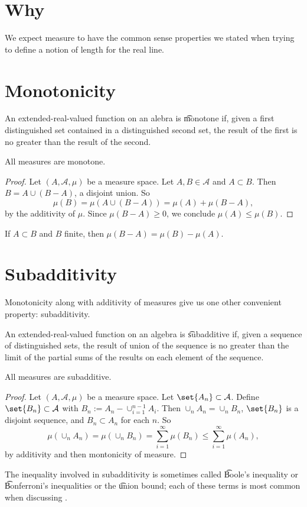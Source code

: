 
\section*{Why}

We expect measure to have the common sense properties we stated when trying to define a notion of length for the real line.

\section*{Monotonicity}

An extended-real-valued function on an alebra is \t{monotone} if, given a first distinguished set contained in a distinguished second set, the result of the first is no greater than the result of the second.

\begin{proposition}
All measures are monotone.
\end{proposition}

\begin{proof}Let $(A, \mathcal{A} , \mu )$ be a measure space.
Let $A, B \in \mathcal{A} $ and $A \subset B$.
Then $B = A \cup (B - A)$, a disjoint union.
So
\[
\mu (B) = \mu (A \cup (B - A))= \mu (A) + \mu (B - A),
\]
by the additivity of $\mu $.
Since $\mu (B - A) \geq 0$,
we conclude $\mu (A) \leq \mu (B)$.\end{proof}
\begin{proposition}
If $A \subset B$ and $B$ finite, then $\mu (B - A) = \mu (B) - \mu (A)$.
\end{proposition}

\section*{Subadditivity}

Monotonicity along with additivity of measures give us one other convenient property: subadditivity.

An extended-real-valued function on an algebra is \t{subadditive} if, given a sequence of distinguished sets, the result of union of the sequence is no greater than the limit of the partial sums of the results on each element of the sequence.

\begin{proposition}
All measures are subadditive.
\end{proposition}

\begin{proof}Let $(A, \mathcal{A} , \mu )$ be a measure space.
Let $\set{A_n} \subset \mathcal{A} $.
Define $\set{B_n} \subset \mathcal{A} $ with $B_n := A_n - \cup_{i = 1}^{n-1} A_i$.
Then $\cup_n A_n = \cup_n B_n$, $\set{B_n}$ is a disjoint sequence, and $B_n \subset A_n$ for each $n$.
So
\[
\mu (\cup_{n} A_n) = \mu (\cup_{n} B_n) = \sum_{i = 1}^{\infty} \mu (B_n) \leq \sum_{i = 1}^{\infty} \mu (A_n),
\]
by additivity and then montonicity of measure.
\end{proof}
The inequality involved in subadditivity is sometimes called \t{Boole's inequality} or \t{Bonferroni's inequalities} or the \t{union bound}; each of these terms is most common when discussing .


